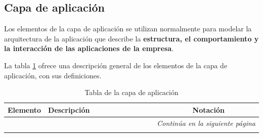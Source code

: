 
\subsection{Capa de aplicación}

Los elementos de la capa de aplicación se utilizan normalmente para modelar la arquitectura de la aplicación que describe la \textbf{estructura, el comportamiento y la interacción de las aplicaciones de la empresa}.

La tabla \ref{tab:Tabla de la capa de aplicación}  ofrece una descripción general de los elementos de la capa de aplicación, con sus definiciones.\cite{archimate} 


\begin{longtable}{|p{0.15\linewidth}|p{0.45\linewidth}|p{0.2\linewidth} p{0.2\linewidth}|}
    \caption{Tabla de la capa de aplicación}
    \\
    \hline
    \rowcolor[HTML]{AFC5F6} 
    \textbf{Elemento} & \textbf{Descripción} & \multicolumn{2}{c|}{\textbf{Notación}} \\
    \hline
    \endhead
    \hline
    \multicolumn{4}{r}{\textit{Continúa en la siguiente página}} \\
    \endfoot
    \hline
    \endlastfoot
    \label{tab:Tabla de la capa de aplicación}




\end{longtable}
